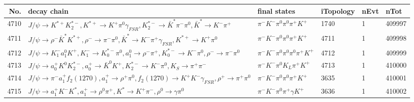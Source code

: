 \begin{table}[htbp] 
\begin{center}
\begin{small}
\begin{tabular}{rlllll}\hline\hline
 No. & decay chain & final states &  iTopology & nEvt & nTot \\\hline
4710&$J/\psi       \rightarrow K^{*+}         K_2^{*-}       , K^{*+}          \rightarrow K^{+}          \pi^{0}        \gamma_{FSR} , K_2^{*-}        \rightarrow \bar{K}^{*}   \pi^{-}        \pi^{0}        , \bar{K}^{*}    \rightarrow K^{-}          \pi^{+}        $&$\pi^{-}        K^{-}          \pi^{0}        \pi^{0}        \pi^{+}        K^{+}          $& 1740&    1&409997\\
4711&$J/\psi       \rightarrow \rho^{-}      \bar{K}^{*}   K^{*+}         , \rho^{-}       \rightarrow \pi^{-}        \pi^{0}        , \bar{K}^{*}    \rightarrow K^{-}          \pi^{+}        \gamma_{FSR} , K^{*+}          \rightarrow K^{+}          \pi^{0}        $&$\pi^{-}        K^{-}          \pi^{0}        \pi^{0}        \pi^{+}        K^{+}          $& 4711&    1&409998\\
4712&$J/\psi       \rightarrow K_{1}^{-}      a_{1}^{0}      K^{+}          , K_{1}^{-}       \rightarrow K_{0}^{*-}     \pi^{0}        , a_{1}^{0}       \rightarrow \rho^{-}      \pi^{+}        , K_{0}^{*-}      \rightarrow K^{-}          \pi^{0}        , \rho^{-}       \rightarrow \pi^{-}        \pi^{0}        $&$\pi^{-}        K^{-}          \pi^{0}        \pi^{0}        \pi^{0}        \pi^{+}        K^{+}          $& 4712&    1&409999\\
4713&$J/\psi       \rightarrow a_{0}^{+}      K^{0}          K_2^{*-}       , a_{0}^{+}       \rightarrow \bar{K}^{0}   K^{+}          , K_2^{*-}        \rightarrow K^{-}          \pi^{0}        , K_{S}           \rightarrow \pi^{+}        \pi^{-}        $&$\pi^{-}        K^{-}          \pi^{0}        K_{L}          \pi^{+}        K^{+}          $& 4713&    1&410000\\
4714&$J/\psi       \rightarrow \pi^{-}        a_{1}^{+}      f_{2}(1270)    , a_{1}^{+}       \rightarrow \rho^{+}      \pi^{0}        , f_{2}(1270)     \rightarrow K^{+}          K^{-}          \gamma_{FSR} , \rho^{+}       \rightarrow \pi^{+}        \pi^{0}        $&$\pi^{-}        K^{-}          \pi^{0}        \pi^{0}        \pi^{+}        K^{+}          $& 3635&    1&410001\\
4715&$J/\psi       \rightarrow a_{1}^{+}      K^{-}          K^{*}          , a_{1}^{+}       \rightarrow \rho^{0}      \pi^{+}        , K^{*}           \rightarrow K^{+}          \pi^{-}        , \rho^{0}       \rightarrow \gamma       \pi^{0}        $&$\pi^{-}        K^{-}          \pi^{0}        \pi^{+}        \gamma       K^{+}          $& 3636&    1&410002\\

\end{tabular}
\end{small}
\end{center}
\end{table}
